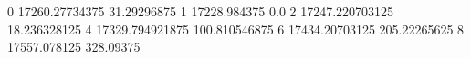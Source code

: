 0 17260.27734375 31.29296875
1 17228.984375 0.0
2 17247.220703125 18.236328125
4 17329.794921875 100.810546875
6 17434.20703125 205.22265625
8 17557.078125 328.09375
